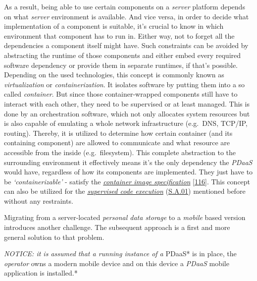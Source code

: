 \documentclass[12pt,english,a4paper,titlepage,cleardoublepage=empty,dottedtoc]{report}
\begin{document}
As a result, being able to use certain components on a \emph{server}
platform depends on what \emph{server} environment is available. And
vice versa, in order to decide what implementation of a component is
suitable, it's crucial to know in which environment that component has
to run in. Either way, not to forget all the dependencies a component
itself might have. Such constraints can be avoided by abstracting the
runtime of those components and either embed every required software
dependency or provide them in separate runtimes, if that's possible.
Depending on the used technologies, this concept is commonly known as
\emph{virtualization} or \emph{containerization}. It isolates software
by putting them into a so called \emph{container}. But since those
container-wrapped components still have to interact with each other,
they need to be supervised or at least managed. This is done by an
orchestration software, which not only allocates system resources but is
also capable of emulating a whole network infrastructure (e.g.~DNS,
TCP/IP, routing). Thereby, it is utilized to determine how certain
container (and its containing component) are allowed to communicate and
what resource are accessible from the inside (e.g.~filesystem). This
complete abstraction to the surrounding environment it effectively means
it's the only dependency the \emph{PDaaS} would have, regardless of how
its components are implemented. They just have to be
\emph{`containerizable'} - satisfy the
\emph{\protect\hyperlink{def--container}{container image specification}}
{[}\protect\hyperlink{ref-web_oci-spec_image}{116}{]}. This concept can
also be utilized for the
\emph{\protect\hyperlink{supervised-data-access}{supervised code
execution}} (\protect\hyperlink{sa01}{S.A.01}) mentioned before without
any restraints.

Migrating from a server-located \emph{personal data storage} to a
\emph{mobile} based version introduces another challenge. The subsequent
approach is a first and more general solution to that problem.

\emph{NOTICE: it is assumed that a running instance of a }PDaaS* is in
place, the \emph{operator} owns a modern mobile device and on this
device a \emph{PDaaS} mobile application is installed.*
\end{document}
